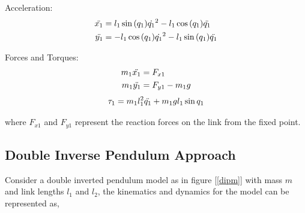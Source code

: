Acceleration:
\begin{equation}
\begin{split}
    \Ddot{x_1} &= l_1 \sin{(q_1)}\Dot{q_1}^2 - l_1\cos{(q_1)}\Ddot{q_1} \\
    \Ddot{y_1} &= -l_1 \cos{(q_1)}\Dot{q_1}^2 - l_1 \sin{(q_1)}\Ddot{q_1}
\end{split}
\end{equation}

Forces and Torques:
\begin{equation}
\begin{split}
    m_1\Ddot{x_1} &= F_{x1} \\
    m_1\Ddot{y_1} &= F_{y1} - m_1g
\end{split} 
\end{equation}
\begin{equation}
    \tau_1 = m_1l_1^2\Ddot{q_1} + m_1gl_1\sin{q_1}
\end{equation}

where $F_{x1}$ and $F_{y1}$ represent the reaction forces on the link from the fixed point.

\subsection{Double Inverse Pendulum Approach}

Consider a double inverted pendulum model as in figure [\ref{dipm}] with mass $m$ and link lengths $l_1$ and $l_2$, the kinematics and dynamics for the model can be represented as,

